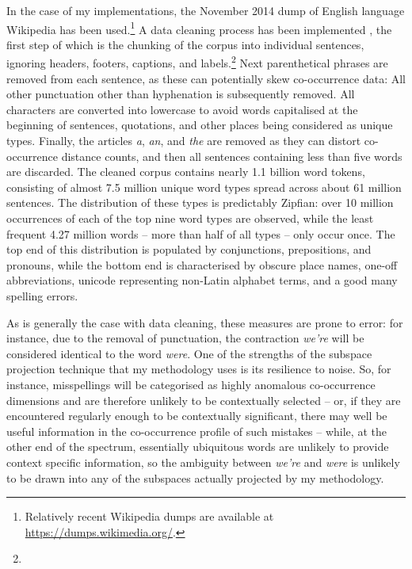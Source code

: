 In the case of my implementations, the November 2014 dump of English language Wikipedia has been used.\footnote{Relatively recent Wikipedia dumps are available at \url{https://dumps.wikimedia.org/}.}  A data cleaning process has been implemented , the first step of which is the chunking of the corpus into individual sentences, ignoring headers, footers, captions, and labels.\footnote{}  Next parenthetical phrases are removed from each sentence, as these can potentially skew co-occurrence data:   All other punctuation other than hyphenation is subsequently removed.  All characters are converted into lowercase to avoid words capitalised at the beginning of sentences, quotations, and other places being considered as unique types.  Finally, the articles \emph{a}, \emph{an}, and \emph{the} are removed as they can distort co-occurrence distance counts, and then all sentences containing less than five words are discarded.  The cleaned corpus contains nearly 1.1 billion word tokens, consisting of almost 7.5 million unique word types spread across about 61 million sentences.  The distribution of these types is predictably Zipfian: over 10 million occurrences of each of the top nine word types are observed, while the least frequent 4.27 million words -- more than half of all types -- only occur once.  The top end of this distribution is populated by conjunctions, prepositions, and pronouns, while the bottom end is characterised by obscure place names, one-off abbreviations, unicode representing non-Latin alphabet terms, and a good many spelling errors.

As is generally the case with data cleaning, these measures are prone to error: for instance, due to the removal of punctuation, the contraction \emph{we're} will be considered identical to the word \emph{were}.  One of the strengths of the subspace projection technique that my methodology uses is its resilience to noise.  So, for instance, misspellings will be categorised as highly anomalous co-occurrence dimensions and are therefore unlikely to be contextually selected -- or, if they are encountered regularly enough to be contextually significant, there may well be useful information in the co-occurrence profile of such mistakes -- while, at the other end of the spectrum, essentially ubiquitous words are unlikely to provide context specific information, so the ambiguity between \emph{we're} and \emph{were} is unlikely to be drawn into any of the subspaces actually projected by my methodology.

